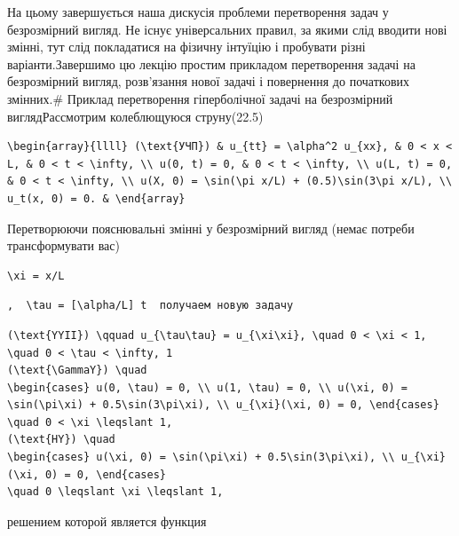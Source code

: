 \documentclass[
  ukrainian,
]{article}
\begin{document}
На цьому завершується наша дискусія проблеми перетворення задач у
безрозмірний вигляд. Не існує універсальних правил, за якими слід
вводити нові змінні, тут слід покладатися на фізичну інтуїцію і
пробувати різні варіанти.Завершимо цю лекцію простим прикладом
перетворення задачі на безрозмірний вигляд, розв'язання нової задачі і
повернення до початкових змінних.\# Приклад перетворення гіперболічної
задачі на безрозмірний виглядРассмотрим колеблющуюся струну(22.5)

\begin{verbatim}
\begin{array}{llll} (\text{УЧП}) & u_{tt} = \alpha^2 u_{xx}, & 0 < x < L, & 0 < t < \infty, \\ u(0, t) = 0, & 0 < t < \infty, \\ u(L, t) = 0, & 0 < t < \infty, \\ u(X, 0) = \sin(\pi x/L) + (0.5)\sin(3\pi x/L), \\ u_t(x, 0) = 0. & \end{array}
\end{verbatim}

Перетворюючи пояснювальні змінні у безрозмірний вигляд (немає потреби
трансформувати вас)

\begin{verbatim}
\xi = x/L
\end{verbatim}

\begin{verbatim}
,  \tau = [\alpha/L] t  получаем новую задачу
\end{verbatim}

\begin{verbatim}
(\text{YYII}) \qquad u_{\tau\tau} = u_{\xi\xi}, \quad 0 < \xi < 1, \quad 0 < \tau < \infty, 1
(\text{\GammaY}) \quad
\begin{cases} u(0, \tau) = 0, \\ u(1, \tau) = 0, \\ u(\xi, 0) = \sin(\pi\xi) + 0.5\sin(3\pi\xi), \\ u_{\xi}(\xi, 0) = 0, \end{cases}
\quad 0 < \xi \leqslant 1,
(\text{HY}) \quad
\begin{cases} u(\xi, 0) = \sin(\pi\xi) + 0.5\sin(3\pi\xi), \\ u_{\xi}(\xi, 0) = 0, \end{cases}
\quad 0 \leqslant \xi \leqslant 1,
\end{verbatim}

решением которой является функция
\end{document}
